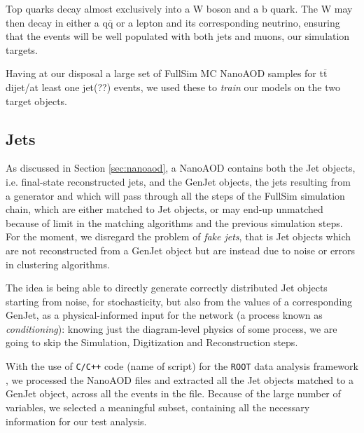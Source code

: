 Top quarks decay almost exclusively into a W boson and a b quark. The W may then decay in either a q$\overline{\text{q}}$ or a lepton and its corresponding neutrino, ensuring that the events will be well populated with both jets and muons, our simulation targets. 


Having at our disposal a large set of FullSim MC NanoAOD samples for t$\overline{\text{t}}$ dijet/at least one jet(??) events, we used these to \emph{train} our models on the two target objects.

\subsection{Jets}

As discussed in Section \ref{sec:nanoaod}, a NanoAOD contains both the Jet objects, i.e. final-state reconstructed jets, and the GenJet objects, the jets resulting from a generator and which will pass through all the steps of the FullSim simulation chain, which are either matched to Jet objects, or may end-up unmatched because of limit in the matching algorithms and the previous simulation steps. For the moment, we disregard the problem of \emph{fake jets}, that is Jet objects which are not reconstructed from a GenJet object but are instead due to noise or errors in clustering algorithms.

The idea is being able to directly generate correctly distributed Jet objects starting from noise, for stochasticity,  but also from the values of a corresponding GenJet, as a physical-informed input for the network (a process known as \emph{conditioning}): knowing just the diagram-level physics of some process, we are going to skip the Simulation, Digitization and Reconstruction steps.


With the use of \texttt{C/C++} code (name of script) for the \texttt{ROOT} data analysis framework \cite{Brun:491486}, we processed the NanoAOD files and extracted all the Jet objects matched to a GenJet object, across all the events in the file. Because of the large number of variables, we selected a meaningful subset, containing all the necessary information for our test analysis.


